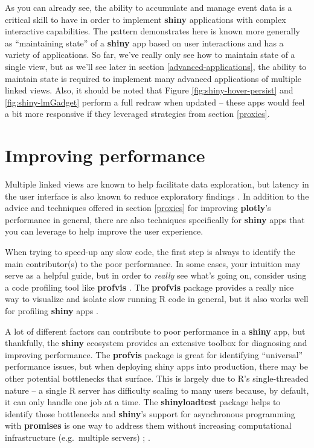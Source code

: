 \documentclass[
  12pt,
]{krantz}
\begin{document}
As you can already see, the ability to accumulate and manage event data is a critical skill to have in order to implement \textbf{shiny} applications with complex interactive capabilities. The pattern demonstrates here is known more generally as ``maintaining state'' of a \textbf{shiny} app based on user interactions and has a variety of applications. So far, we've really only see how to maintain state of a single view, but as we'll see later in section \ref{advanced-applications}, the ability to maintain state is required to implement many advanced applications of multiple linked views. Also, it should be noted that Figure \ref{fig:shiny-hover-persist} and \ref{fig:shiny-lmGadget} perform a full redraw when updated -- these apps would feel a bit more responsive if they leveraged strategies from section \ref{proxies}.

\hypertarget{shiny-performance}{%
\section{Improving performance}\label{shiny-performance}}

Multiple linked views are known to help facilitate data exploration, but latency in the user interface is also known to reduce exploratory findings \citep{2014-latency}. In addition to the advice and techniques offered in section \ref{proxies} for improving \textbf{plotly}'s performance in general, there are also techniques specifically for \textbf{shiny} apps that you can leverage to help improve the user experience.

When trying to speed-up any slow code, the first step is always to identify the main contributor(s) to the poor performance. In some cases, your intuition may serve as a helpful guide, but in order to \emph{really} see what's going on, consider using a code profiling tool like \textbf{profvis} \citep{profvis}. The \textbf{profvis} package provides a really nice way to visualize and isolate slow running R code in general, but it also works well for profiling \textbf{shiny} apps \citep{profvis-shiny}.

A lot of different factors can contribute to poor performance in a \textbf{shiny} app, but thankfully, the \textbf{shiny} ecosystem provides an extensive toolbox for diagnosing and improving performance. The \textbf{profvis} package is great for identifying ``universal'' performance issues, but when deploying shiny apps into production, there may be other potential bottlenecks that surface. This is largely due to R's single-threaded nature -- a single R server has difficulty scaling to many users because, by default, it can only handle one job at a time. The \textbf{shinyloadtest} package helps to identify those bottlenecks and \textbf{shiny}'s support for asynchronous programming with \textbf{promises} is one way to address them without increasing computational infrastructure (e.g.~multiple servers) \citep{shinyloadtest}; \citep{promises}.
\end{document}

